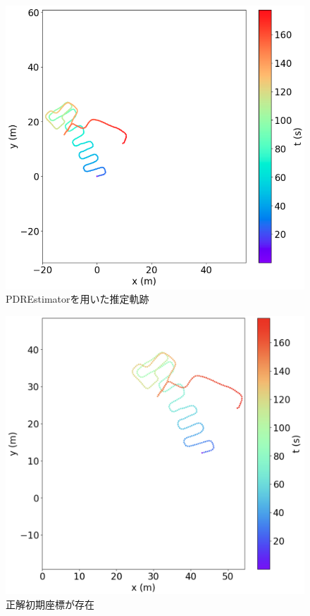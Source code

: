 \begin{figure}[H]
    \centering
    \includegraphics[width=\linewidth]{../image/pdr.jpg}
    \caption{PDREstimatorを用いた推定軌跡}    \label{fig:pdr}
\end{figure}

\begin{figure}[H]
    \centering
    \includegraphics[width=\linewidth]{../image/pdr-move.jpg}
    \caption{正解初期座標が存在}    \label{fig:pdr-move}
\end{figure}



